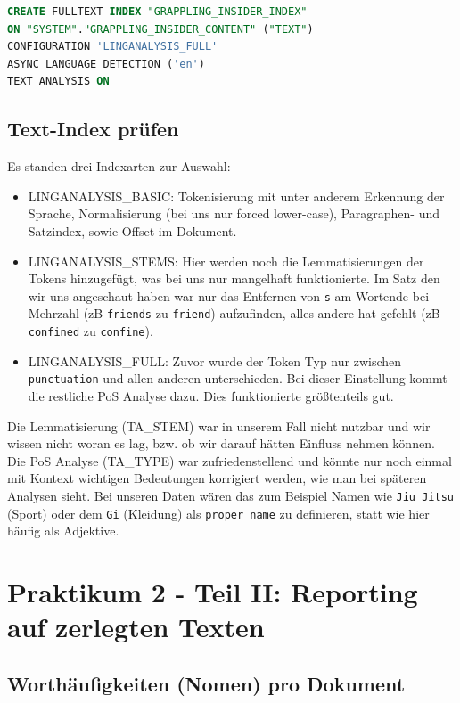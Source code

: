 {\color{MidnightBlue}
\begin{lstlisting}[language=SQL]
CREATE FULLTEXT INDEX "GRAPPLING_INSIDER_INDEX"
ON "SYSTEM"."GRAPPLING_INSIDER_CONTENT" ("TEXT")
CONFIGURATION 'LINGANALYSIS_FULL'
ASYNC LANGUAGE DETECTION ('en')
TEXT ANALYSIS ON
\end{lstlisting}}

\subsection{Text-Index prüfen}

Es standen drei Indexarten zur Auswahl:
\begin{itemize}
	\item LINGANALYSIS\_BASIC: Tokenisierung mit unter anderem Erkennung der Sprache, Normalisierung (bei uns nur forced lower-case), Paragraphen- und Satzindex, sowie Offset im Dokument.
	\item LINGANALYSIS\_STEMS: Hier werden noch die Lemmatisierungen der Tokens hinzugefügt, was bei uns nur mangelhaft funktionierte. Im Satz den wir uns angeschaut haben war nur das Entfernen von \texttt{s} am Wortende bei Mehrzahl (zB \texttt{friends} zu \texttt{friend}) aufzufinden, alles andere hat gefehlt (zB \texttt{confined} zu \texttt{confine}).
	\item LINGANALYSIS\_FULL: Zuvor wurde der Token Typ nur zwischen \texttt{punctuation} und allen anderen unterschieden. Bei dieser Einstellung kommt die restliche PoS Analyse dazu. Dies funktionierte grö\ss{}tenteils gut.
\end{itemize}

\noindent Die Lemmatisierung (TA\_STEM) war in unserem Fall nicht nutzbar und wir wissen nicht woran es lag, bzw. ob wir darauf hätten Einfluss nehmen können. Die PoS Analyse (TA\_TYPE) war zufriedenstellend und könnte nur noch einmal mit Kontext wichtigen Bedeutungen korrigiert werden, wie man bei späteren Analysen sieht. Bei unseren Daten wären das zum Beispiel Namen wie \texttt{Jiu Jitsu} (Sport) oder dem \texttt{Gi} (Kleidung) als \texttt{proper name} zu definieren, statt wie hier häufig als Adjektive.

\setcounter{section}{1}
\section{Praktikum 2 - Teil II: Reporting auf zerlegten Texten}

\subsection{Worthäufigkeiten (Nomen) pro Dokument}

